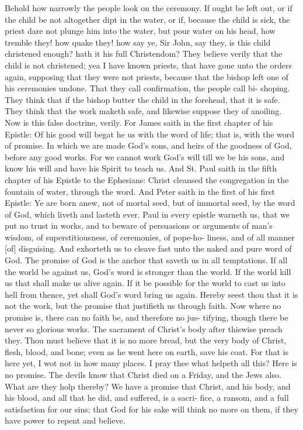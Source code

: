 \documentclass{custom}
\begin{document}
Behold how narrowly the people look on the ceremony. 
If ought be left out, or if the child be not altogether dipt 
in the water, or if, because the child is sick, the priest 
dare not plunge him into the water, but pour water on his 
head, how tremble they! how quake they! how say ye, 
Sir John, say they, is this child christened enough? hath it 
his full Christendom? They believe verily that the child 
is not christened; yea I have known priests, that have 
gone unto the orders again, supposing that they were not 
priests, because that the bishop left one of his ceremonies 
undone. That they call confirmation, the people call bi- 
shoping. They think that if the bishop butter the child 
in the forehead, that it is safe. They think that the work 
maketh safe, and likewise suppose they of anoiling. Now 
is this false doctrine, verily. For James saith in the first 
chapter of his Epistle: Of his good will begat he us with 
the word of life; that is, with the word of promise. In 
which we are made God's sons, and heirs of the goodness 
of God, before any good works. For we cannot work 
God's will till we be his sons, and know his will and 
have his Spirit to teach us. And St. Paul saith in the 
fifth chapter of his Epistle to the Ephesians: Christ 
cleansed the congregation in the fountain of water, through 
the word. And Peter saith in the first of his first Epistle: 
Ye are born anew, not of mortal seed, but of immortal 
seed, by the word of God, which liveth and lasteth ever. 
Paul in every epistle warneth us, that we put no trust in 
works, and to beware of persuasions or arguments of man's 
wisdom, of superstitiousness, of ceremonies, of pope-ho- 
liness, and of all manner [of] disguising. And exhorteth 
us to cleave fast unto the naked and pure word of God. 
The promise of God is the anchor that saveth us in all 
temptations. If all the world be against us, God's word 
is stronger than the world. If the world kill us that shall 
make us alive again. If it be possible for the world to 
cast us into hell from thence, yet shall God's word bring 
us again. Hereby seest thou that it is not the work, but 
the promise that justifieth us through faith. Now where 
no promise is, there can no faith be, and therefore no jus- 
tifying, though there be never so glorious works. The 
sacrament of Christ's body after thiswise preach they. 
Thou must believe that it is no more bread, but the very 
body of Christ, flesh, blood, and bone; even as he went 
here on earth, save his coat. For that is here yet, I wot 
not in how many places. I pray thee what helpeth all 
this? Here is no promise. The devils know that Christ 
died on a Friday, and the Jews also. What are they holp 
thereby? We have a promise that Christ, and his body, 
and his blood, and all that he did, and suffered, is a sacri- 
fice, a ransom, and a full satisfaction for our sins; that 
God for his sake will think no more on them, if they have 
power to repent and believe. 
\end{document}
